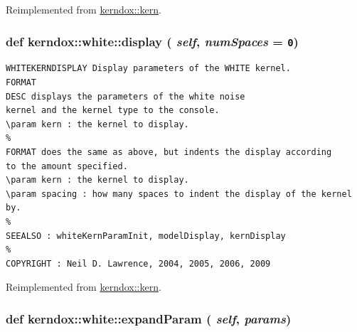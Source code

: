 Reimplemented from \hyperlink{classkerndox_1_1kern}{kerndox::kern}.\hypertarget{classkerndox_1_1white_116d1d61e0eeee8609c876dba99a05d9}{
\subsubsection[{display}]{\setlength{\rightskip}{0pt plus 5cm}def kerndox::white::display ( {\em self}, \/   {\em numSpaces} = {\tt 0})}}
\label{classkerndox_1_1white_116d1d61e0eeee8609c876dba99a05d9}




\footnotesize\begin{verbatim}WHITEKERNDISPLAY Display parameters of the WHITE kernel.
FORMAT
DESC displays the parameters of the white noise
kernel and the kernel type to the console.
\param kern : the kernel to display.
%
FORMAT does the same as above, but indents the display according
to the amount specified.
\param kern : the kernel to display.
\param spacing : how many spaces to indent the display of the kernel by.
%
SEEALSO : whiteKernParamInit, modelDisplay, kernDisplay
%
COPYRIGHT : Neil D. Lawrence, 2004, 2005, 2006, 2009

\end{verbatim}
\normalsize
 

Reimplemented from \hyperlink{classkerndox_1_1kern}{kerndox::kern}.\hypertarget{classkerndox_1_1white_ffc20aaa72aee2a83c2a57e70a67bce0}{
\subsubsection[{expandParam}]{\setlength{\rightskip}{0pt plus 5cm}def kerndox::white::expandParam ( {\em self}, \/   {\em params})}}
\label{classkerndox_1_1white_ffc20aaa72aee2a83c2a57e70a67bce0}




